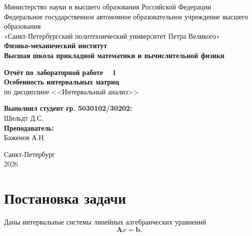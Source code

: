 \documentclass[a4paper, 14pt]{extarticle}
\begin{document}
\begin{titlepage}
    \begin{center}
        Министерство науки и высшего образования Российской Федерации\\
        Федеральное государственное автономное образовательное учреждение высшего образования\\
        «Санкт-Петербургский политехнический университет Петра Великого»\\
        
        \textbf{Физико-механический институт}\\
        \textbf{Высшая школа прикладной математики и вычислительной физики}
    \end{center}

    \vfill
    
    \begin{center}
        \textbf{Отчёт по лабораторной работе \textnumero~ 1\\[0.5cm]}
        \textbf{Особенность интервальных матриц\\}
        по дисциплине <<Интервальный анализ>>
    \end{center}

    \vfill

    \hfill
    \begin{minipage}{0.45\textwidth}
        \textbf{Выполнил студент гр. 5030102/30202:}\\
        Шильдт Д.С.\\[0.5cm]
        \textbf{Преподаватель:}\\ 
        Баженов А.Н.
    \end{minipage}

    \vfill

    \begin{center}
        Санкт-Петербург\\2026
    \end{center}
\end{titlepage}

\setcounter{page}{2}

\tableofcontents
\newpage

\section{Постановка задачи}

Даны интервальные системы линейных алгебраических уравнений \[\mathbf{A}x = \mathbf{b}.\]
\end{document}
